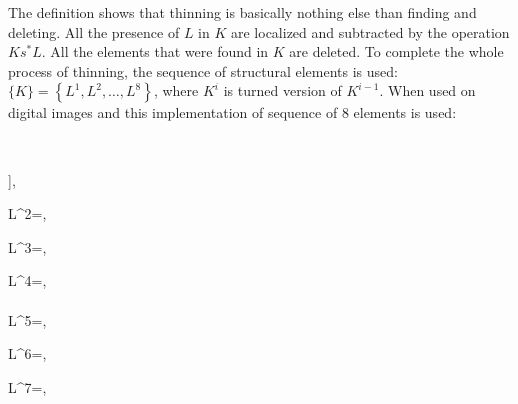The definition shows that thinning is basically nothing else than finding and deleting. All the presence of $L$ in $K$ are localized and subtracted by the operation $K s^* L$. All the elements that were found in $K$ are deleted. To complete the whole process of thinning, the sequence of structural elements is used: $\{K\}=\left\{L^{1}, L^{2}, \ldots, L^{8}\right\}$, where $K^{i}$ is turned version of $K^{i-1}$. When used on digital images and this implementation of sequence of 8 elements is used: \cite{serra1988mathematical}

$$\begin{array}{l}
 
L^{1}=, 

\quad L^{2}=, 

\quad L^{3}=, 

\quad L^{4}=, \\

\\
L^{5}=, 

\quad L^{6}=, 

\quad L^{7}=, 

